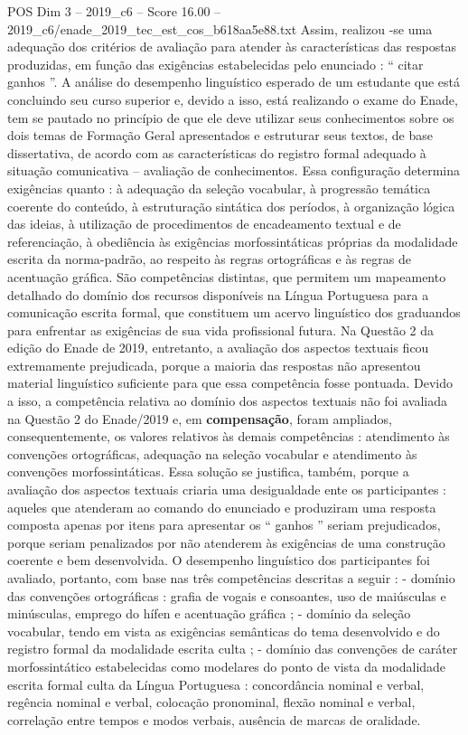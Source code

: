 \begin{textsample}{POS Dim 3 – 2019\_c6 – Score 16.00 – 2019\_c6/enade\_2019\_tec\_est\_cos\_b618aa5e88.txt}
Assim, realizou -se uma adequação dos critérios de avaliação para atender às características das respostas produzidas, em função das exigências estabelecidas pelo enunciado : “ citar ganhos ”.
A análise do desempenho linguístico esperado de um estudante que está concluindo seu curso superior e, devido a isso, está realizando o exame do Enade, tem se pautado no princípio de que ele deve utilizar seus conhecimentos sobre os dois temas de Formação Geral apresentados e estruturar seus textos, de base dissertativa, de acordo com as características do registro formal adequado à situação comunicativa – avaliação de conhecimentos.
Essa configuração determina exigências quanto : à adequação da seleção vocabular, à progressão temática coerente do conteúdo, à estruturação sintática dos períodos, à organização lógica das ideias, à utilização de procedimentos de encadeamento textual e de referenciação, à obediência às exigências morfossintáticas próprias da modalidade escrita da norma-padrão, ao respeito às regras ortográficas e às regras de acentuação gráfica.
São competências distintas, que permitem um mapeamento detalhado do domínio dos recursos disponíveis na Língua Portuguesa para a comunicação escrita formal, que constituem um acervo linguístico dos graduandos para enfrentar as exigências de sua vida profissional futura.
Na Questão 2 da edição do Enade de 2019, entretanto, a avaliação dos aspectos textuais ficou extremamente prejudicada, porque a maioria das respostas não apresentou material linguístico suficiente para que essa competência fosse pontuada.
Devido a isso, a competência relativa ao domínio dos aspectos textuais não foi avaliada na Questão 2 do Enade/2019 e, em \textbf{compensação}, foram ampliados, consequentemente, os valores relativos às demais competências : atendimento às convenções ortográficas, adequação na seleção vocabular e atendimento às convenções morfossintáticas.
Essa solução se justifica, também, porque a avaliação dos aspectos textuais criaria uma desigualdade ente os participantes : aqueles que atenderam ao comando do enunciado e produziram uma resposta composta apenas por itens para apresentar os “ ganhos ” seriam prejudicados, porque seriam penalizados por não atenderem às exigências de uma construção coerente e bem desenvolvida.
O desempenho linguístico dos participantes foi avaliado, portanto, com base nas três competências descritas a seguir : - domínio das convenções ortográficas : grafia de vogais e consoantes, uso de maiúsculas e minúsculas, emprego do hífen e acentuação gráfica ; - domínio da seleção vocabular, tendo em vista as exigências semânticas do tema desenvolvido e do registro formal da modalidade escrita culta ; - domínio das convenções de caráter morfossintático estabelecidas como modelares do ponto de vista da modalidade escrita formal culta da Língua Portuguesa : concordância nominal e verbal, regência nominal e verbal, colocação pronominal, flexão nominal e verbal, correlação entre tempos e modos verbais, ausência de marcas de oralidade.

\end{textsample}
